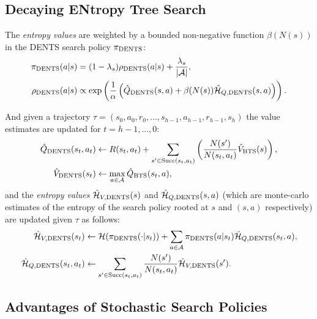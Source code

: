     \subsection{Decaying ENtropy Tree Search}


        The \textit{entropy values} are weighted by a bounded non-negative function $\beta(N(s))$ in the DENTS search policy ${\pi_{{\textnormal{DENTS}}}}$:
        \begin{align}
            {\pi_{{\textnormal{DENTS}}}}(a|s) &= (1-\lambda_s){\rho_{{\textnormal{DENTS}}}}(a|s) + \frac{\lambda_s}{|\mathcal{A}|}, 
                        \label{eq:dents_search_policy} \\ 
            {\rho_{{\textnormal{DENTS}}}}(a|s) &\propto \exp\left(\frac{1}{\alpha}\left({\hat{Q}_{{\textnormal{DENTS}}}}(s,a)+\beta(N(s)){\hat{\mathcal{H}}_{Q,{\textnormal{DENTS}}}}(s,a)\right)\right).
                        \label{eq:dents_value_policy}
        \end{align}

        And given a trajectory $\tau=(s_0,a_0,r_0,...,s_{h-1},a_{h-1},r_{h-1},s_h)$ the value estimates are updated for $t=h-1,...,0$:
        \begin{align}
            {\hat{Q}_{{\textnormal{DENTS}}}}(s_t,a_t) &\leftarrow 
                R(s_t,a_t) + \sum_{s' \in {\textnormal{Succ}(s_t,a_t)}} \left( \frac{N(s')}{N(s_t,a_t)} {\hat{V}_{{\textnormal{BTS}}}}(s) \right), 
                        \label{eq:dents_q_backup} \\ 
            {\hat{V}_{{\textnormal{DENTS}}}}(s_t) &\leftarrow \max_{a\in\mathcal{A}} {\hat{Q}_{{\textnormal{BTS}}}}(s_t,a), 
                        \label{eq:dents_v_backup} 
        \end{align}
        and the \textit{entropy values} ${\hat{\mathcal{H}}_{V,{\textnormal{DENTS}}}}(s)$ and ${\hat{\mathcal{H}}_{Q,{\textnormal{DENTS}}}}(s,a)$ (which are monte-carlo estimates of the entropy of the search policy rooted at $s$ and $(s,a)$ respectively) are updated given $\tau$ as follows:
        \begin{align}
            {\hat{\mathcal{H}}_{V,{\textnormal{DENTS}}}}(s_t) &\leftarrow \mathcal{H}({\pi_{{\textnormal{DENTS}}}}(\cdot | s_t)) + \sum_{a\in\mathcal{A}} {\pi_{{\textnormal{DENTS}}}}(a|s_t){\hat{\mathcal{H}}_{Q,{\textnormal{DENTS}}}}(s_t,a), \label{eq:dents_entropy_v_backup} \\
            {\hat{\mathcal{H}}_{Q,{\textnormal{DENTS}}}}(s_t,a_t) &\leftarrow \sum_{s'\in {\textnormal{Succ}(s_t,a_t)}} \frac{N(s')}{N(s_t,a_t)} {\hat{\mathcal{H}}_{V,{\textnormal{DENTS}}}}(s').  \label{eq:dents_entropy_q_backup}
        \end{align}



    \subsection{Advantages of Stochastic Search Policies}

